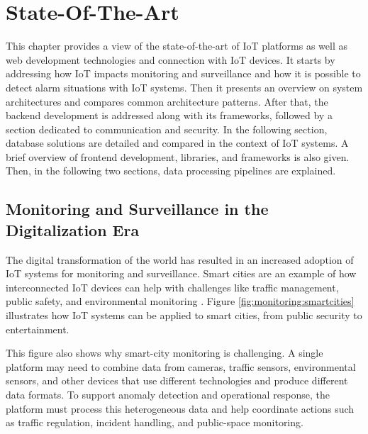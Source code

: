 
%

\chapter{State-Of-The-Art}
\label{cha:State-Of-The-Art}

This chapter provides a view of the state-of-the-art of \gls{IoT} platforms
as well as web development technologies and connection with \gls{IoT} devices.
It starts by addressing how \gls{IoT} impacts monitoring and surveillance and how it is
possible to detect alarm situations with \gls{IoT} systems. Then it presents an overview on system architectures and compares common
architecture patterns. After that, the backend development is addressed along with
its frameworks, followed by a section dedicated to communication and security.
In the following section, database solutions are detailed and compared in the context of IoT
systems. A brief overview of frontend development, libraries, and frameworks is
also given.
Then, in the following two sections, data processing pipelines are explained.

\section{Monitoring and Surveillance in the Digitalization Era}
The digital transformation of the world has resulted in an increased adoption
of \gls{IoT} systems for monitoring and surveillance. Smart cities are an
example of how interconnected \gls{IoT} devices can help with challenges
like traffic management, public safety, and environmental monitoring \cite{sharma2024}. Figure
\ref{fig:monitoring:smartcities}
illustrates how \gls{IoT} systems can be applied to smart cities, from public
security to entertainment.

This figure also shows why smart-city monitoring is challenging. A single
platform may need to combine data from cameras, traffic sensors,
environmental sensors, and other devices that use different technologies and
produce different data formats. To support anomaly detection and operational
response, the platform must process this heterogeneous data and help coordinate
actions such as traffic regulation, incident handling, and public-space
monitoring.

